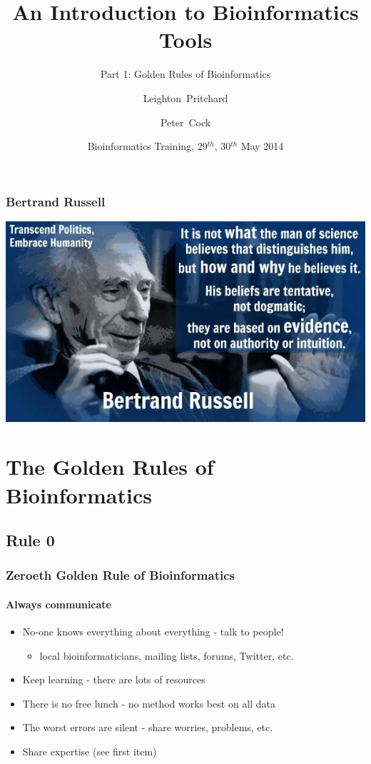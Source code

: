 \documentclass[table]{beamer}
\title[Intro to Bioinformatics] %
{An Introduction to Bioinformatics Tools}
\subtitle{Part 1: Golden Rules of Bioinformatics}
\author[Pritchard, Cock] %
{Leighton~Pritchard \and Peter~Cock}
\institute[The James Hutton Institute] %
{
  Information and Computational Sciences\\
  The James Hutton Institute
}
\date[May 2014] %
{Bioinformatics Training, 29$^{th}$, 30$^{th}$ May 2014}
\begin{document}
  \frame[plain]{\titlepage}
  
  \begin{frame}
    \frametitle{Bertrand Russell}
    \begin{center}
      \includegraphics[width=\textwidth]{images/bertrand}
    \end{center}
  \end{frame}
    
  \section{The Golden Rules of Bioinformatics}

  \subsection{Rule 0}
  \begin{frame}
    \frametitle{Zeroeth Golden Rule of Bioinformatics}
    \framesubtitle{Always communicate}
	\begin{itemize}
	  \item No-one knows everything about everything - talk to people!
	  \begin{itemize}
	    \item local bioinformaticians, mailing lists, forums, Twitter, etc.
	  \end{itemize}
	  \item Keep learning - there are lots of resources
	  \item There is no free lunch - no method works best on all data
	  \item The worst errors are silent - share worries, problems, etc.
	  \item Share expertise (see first item)
	\end{itemize}
  \end{frame}
\end{document}
